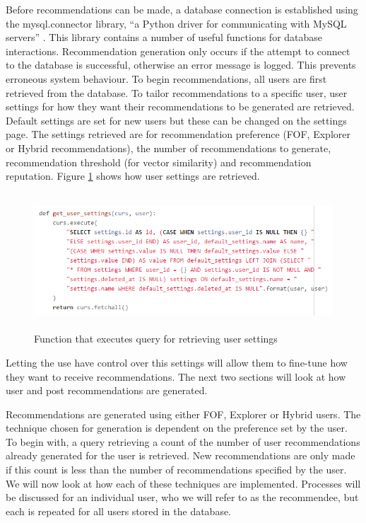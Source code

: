Before recommendations can be made, a database connection is established using the mysql.connector library, ``a Python driver for communicating with MySQL servers'' \cite{MySQL:MySQLConnector}. This library contains a number of useful functions for database interactions. Recommendation generation only occurs if the attempt to connect to the database is successful, otherwise an error message is logged. This prevents erroneous system behaviour. To begin recommendations, all users are first retrieved from the database. To tailor recommendations to a specific user, user settings for how they want their recommendations to be generated are retrieved. Default settings are set for new users but these can be changed on the settings page. The settings retrieved are for recommendation preference (FOF, Explorer or Hybrid recommendations), the number of recommendations to generate, recommendation threshold (for vector similarity) and recommendation reputation. Figure \ref{fig:RecommendationSettings} shows how user settings are retrieved.


\begin{figure}[H]
\centering
\includegraphics[height=2in]{Images/Implementation/RecommendationSettings}
\caption{Function that executes query for retrieving user settings}
\label{fig:RecommendationSettings}
\end{figure}

\noindent Letting the use have control over this settings will allow them to fine-tune how they want to receive recommendations. The next two sections will look at how user and post recommendations are generated.

Recommendations are generated using either FOF, Explorer or Hybrid users. The technique chosen for generation is dependent on the preference set by the user. To begin with, a query retrieving a count of the number of user recommendations already generated for the user is retrieved. New recommendations are only made if this count is less than the number of recommendations specified by the user. We will now look at how each of these techniques are implemented. Processes will be discussed for an individual user, who we will refer to as the recommendee, but each is repeated for all users stored in the database.

